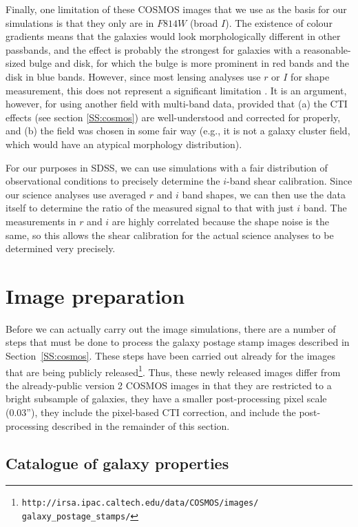 \documentclass[twocolumn,useAMS,usenatbib]{mn2e}
\newcommand{\newtext}{}
\begin{document}
Finally, one limitation of these COSMOS images that we use as the
basis for our simulations is that they only are in $F814W$ (broad $I$).
The existence of colour gradients means that the galaxies would look
morphologically different in other passbands, and the effect is probably the strongest
for galaxies with a reasonable-sized bulge and disk, for which the
bulge is more prominent in red bands and the disk in blue bands.
However, since most lensing analyses use $r$ or $I$ for shape
measurement, this does not represent a significant limitation \citep{2011arXiv1105.5595V}.  It is
an argument, however, for using another field with multi-band data,
provided that (a) the CTI effects (see section \ref{SS:cosmos}) are well-understood and corrected
for properly, and (b) the field was chosen in some fair way (e.g., it
is not a galaxy cluster field, which would have an atypical morphology
distribution).

For our purposes in SDSS, we can use simulations with a fair
distribution of observational conditions to precisely
determine the $i$-band shear calibration.  Since our science analyses
use averaged $r$ and $i$ band shapes, we can then use the data itself
to determine the ratio of the measured signal to that with just $i$
band.  The measurements in $r$ and $i$ are highly correlated because the shape noise
is the same, so this allows the shear calibration for the actual
science analyses to be determined very precisely.

\section{Image preparation}\label{S:imageprep}

Before we can actually carry out the image simulations, there are a
number of steps that must be done to process the galaxy postage stamp
images described in Section~\ref{SS:cosmos}.  These steps
have been carried out already for the images that are being
publicly
released\footnote{\texttt{http://irsa.ipac.caltech.edu/data/COSMOS/images/\linebreak
    galaxy\_postage\_stamps/}}.
\newtext{Thus, these newly released images differ from the already-public
version 2 COSMOS images in that they are restricted to a bright
subsample of galaxies, they have
a smaller post-processing pixel scale (0.03''), they include the pixel-based CTI
correction, and include the post-processing described in the remainder
of this section.} 

\subsection{Catalogue of galaxy properties}\label{SS:catalogue}
\end{document}
